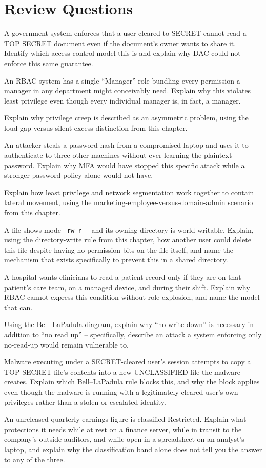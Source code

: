 \section*{Review Questions}
\begin{reviewquestions}
\item A government system enforces that a user cleared to SECRET cannot read a TOP SECRET document
even if the document's owner wants to share it. Identify which access control model this is and
explain why DAC could not enforce this same guarantee.
\item An RBAC system has a single ``Manager'' role bundling every permission a manager in any
department might conceivably need. Explain why this violates least privilege even though every
individual manager is, in fact, a manager.
\item Explain why privilege creep is described as an asymmetric problem, using the loud-gap versus
silent-excess distinction from this chapter.
\item An attacker steals a password hash from a compromised laptop and uses it to authenticate to
three other machines without ever learning the plaintext password. Explain why MFA would have
stopped this specific attack while a stronger password policy alone would not have.
\item Explain how least privilege and network segmentation work together to contain lateral
movement, using the marketing-employee-versus-domain-admin scenario from this chapter.
\item A file shows mode \texttt{-rw-r-----} and its owning directory is world-writable. Explain,
using the directory-write rule from this chapter, how another user could delete this file despite
having no permission bits on the file itself, and name the mechanism that exists specifically to
prevent this in a shared directory.
\item A hospital wants clinicians to read a patient record only if they are on that patient's care
team, on a managed device, and during their shift. Explain why RBAC cannot express this condition
without role explosion, and name the model that can.
\item Using the Bell--LaPadula diagram, explain why ``no write down'' is necessary in addition to
``no read up'' -- specifically, describe an attack a system enforcing only no-read-up would remain
vulnerable to.
\item Malware executing under a SECRET-cleared user's session attempts to copy a TOP SECRET file's
contents into a new UNCLASSIFIED file the malware creates. Explain which Bell--LaPadula rule blocks
this, and why the block applies even though the malware is running with a legitimately cleared
user's own privileges rather than a stolen or escalated identity.
\item An unreleased quarterly earnings figure is classified Restricted. Explain what protections it
needs while at rest on a finance server, while in transit to the company's outside auditors, and
while open in a spreadsheet on an analyst's laptop, and explain why the classification band alone
does not tell you the answer to any of the three.
\end{reviewquestions}

